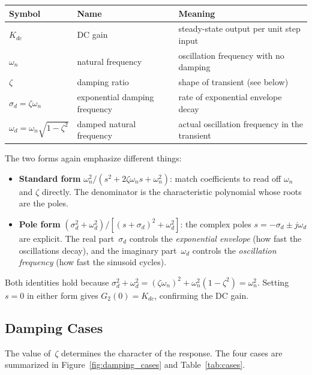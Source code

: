 \documentclass[12pt]{article}
\begin{document}
\begin{center}
\begin{tabular}{lll}
  \toprule
  Symbol & Name & Meaning \\
  \midrule
  $K_{dc}$ & DC gain & steady-state output per unit step input \\
  $\omega_n$ & natural frequency & oscillation frequency with no damping \\
  $\zeta$ & damping ratio & shape of transient (see below) \\
  $\sigma_d = \zeta\omega_n$ & exponential damping frequency &
    rate of exponential envelope decay \\
  $\omega_d = \omega_n\sqrt{1-\zeta^2}$ & damped natural frequency &
    actual oscillation frequency in the transient \\
  \bottomrule
\end{tabular}
\end{center}

The two forms again emphasize different things:

\begin{itemize}
  \item \textbf{Standard form} $\omega_n^2/(s^2 + 2\zeta\omega_n s + \omega_n^2)$:
    match coefficients to read off $\omega_n$ and $\zeta$ directly.
    The denominator is the characteristic polynomial whose roots are the poles.
  \item \textbf{Pole form} $(\sigma_d^2+\omega_d^2)/[(s+\sigma_d)^2+\omega_d^2]$:
    the complex poles $s = -\sigma_d \pm j\omega_d$ are explicit.  The real
    part~$\sigma_d$ controls the \emph{exponential envelope} (how fast the
    oscillations decay), and the imaginary part~$\omega_d$ controls the
    \emph{oscillation frequency} (how fast the sinusoid cycles).
\end{itemize}

Both identities hold because $\sigma_d^2 + \omega_d^2 = (\zeta\omega_n)^2 +
\omega_n^2(1-\zeta^2) = \omega_n^2$.  Setting $s=0$ in either form gives
$G_2(0) = K_{dc}$, confirming the DC gain.

\subsection{Damping Cases}
\label{sec:second_cases}

The value of~$\zeta$ determines the character of the response.  The four cases
are summarized in Figure~\ref{fig:damping_cases} and Table~\ref{tab:cases}.
\end{document}
